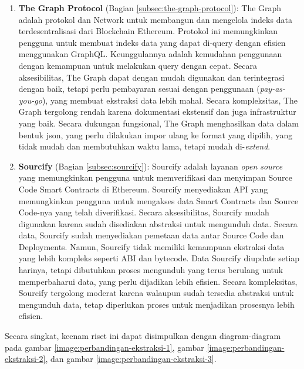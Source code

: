 \begin{enumerate}
    \item \textbf{The Graph Protocol} \parencite{TheGraphDocs} (Bagian \ref{subsec:the-graph-protocol}): The Graph adalah protokol dan Network untuk membangun dan mengelola indeks data terdesentralisasi dari Blockchain Ethereum. Protokol ini memungkinkan pengguna untuk membuat indeks data yang dapat di-query dengan efisien menggunakan GraphQL. Keunggulannya adalah kemudahan penggunaan dengan kemampuan untuk melakukan query dengan cepat. Secara aksesibilitas, The Graph dapat dengan mudah digunakan dan terintegrasi dengan baik, tetapi perlu pembayaran sesuai dengan penggunaan (\textit{pay-as-you-go}), yang membuat ekstraksi data lebih mahal. Secara kompleksitas, The Graph tergolong rendah karena dokumentasi ekstensif dan juga infrastruktur yang baik. Secara dukungan fungsional, The Graph menghasilkan data dalam bentuk json, yang perlu dilakukan impor ulang ke format yang dipilih, yang tidak mudah dan membutuhkan waktu lama, tetapi mudah di-\textit{extend}.
    
    \item \textbf{Sourcify} \parencite{sourcify_website} (Bagian \ref{subsec:sourcify}): Sourcify adalah layanan \textit{open source} yang memungkinkan pengguna untuk memverifikasi dan menyimpan Source Code Smart Contracts di Ethereum. Sourcify menyediakan API yang memungkinkan pengguna untuk mengakses data Smart Contracts dan Source Code-nya yang telah diverifikasi. Secara aksesibilitas, Sourcify mudah digunakan karena sudah disediakan abstraksi untuk mengunduh data. Secara data, Sourcify sudah menyediakan pemetaan data antar Source Code dan Deployments. Namun, Sourcify tidak memiliki kemampuan ekstraksi data yang lebih kompleks seperti ABI dan bytecode. Data Sourcify diupdate setiap harinya, tetapi dibutuhkan proses mengunduh yang terus berulang untuk memperbaharui data, yang perlu dijadikan lebih efisien. Secara kompleksitas, Sourcify tergolong moderat karena walaupun sudah tersedia abstraksi untuk mengunduh data, tetap diperlukan proses untuk menjadikan prosesnya lebih efisien.
\end{enumerate}

Secara singkat, keenam riset ini dapat disimpulkan dengan diagram-diagram pada gambar \ref{image:perbandingan-ekstraksi-1}, gambar \ref{image:perbandingan-ekstraksi-2}, dan gambar \ref{image:perbandingan-ekstraksi-3}.

\newpage

